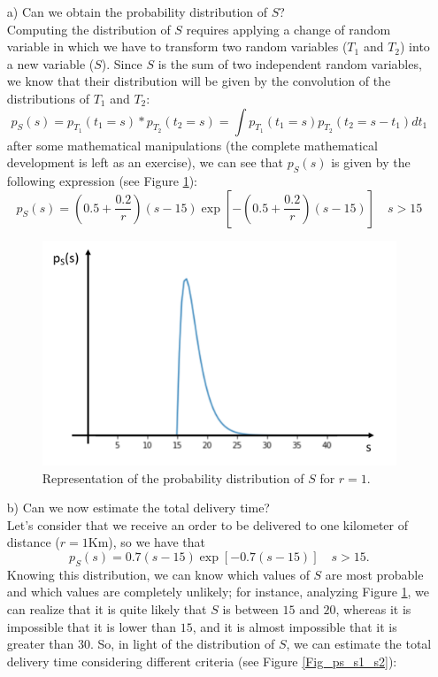 \begin{solution} 

\begin{itemize}
\item[a)] Can we obtain the probability distribution of $S$? \\
Computing the distribution of $S$ requires applying a change of random variable in which we have to transform two random variables ($T_1$ and $T_2$) into a new variable ($S$). Since $S$ is the sum of two independent random variables, we know that their distribution will be given by the convolution of the distributions of $T_1$ and $T_2$: 
$$ p_S(s) = p_{T_1} (t_1=s) \ast  p_{T_2} (t_2=s)  = \int  p_{T_1} (t_1=s)  p_{T_2} (t_2=s-t_1) d t_1   $$
after some mathematical manipulations (the complete mathematical development is left as an exercise), we can see that $p_S(s)$ is given by the following expression (see Figure \ref{Fig_ps}):
$$ p_S(s) = \left(0.5 + \frac{0.2}{r}\right) \left(s -15\right) \exp{\left[-\left(0.5 + \frac{0.2}{r}\right) \left(s-15\right)  \right]}   \quad  s >15$$

\begin{figure}[!t]
\begin{center}
\includegraphics[scale=.25]{Figures/Fig_MC1_1.png}
\caption{Representation of the probability distribution of $S$ for $r=1$.}
\label{Fig_ps}
\end{center}
\end{figure}
\vspace{0.2cm}
\item[b)] Can we now estimate the total delivery time?\\
Let's consider that we receive an order to be delivered to one kilometer of distance ($r=1$Km), so we have that 
$$ p_S(s) = 0.7 \left(s -15\right) \exp{\left[-0.7 \left(s-15\right)  \right]}   \quad  s >15.$$
Knowing this distribution, we can know which values of $S$ are most probable and which values are completely unlikely; for instance, analyzing Figure \ref{Fig_ps}, we can realize that it is quite likely that $S$ is between $15$ and $20$, whereas it is impossible that it is lower than $15$, and it is almost impossible that it is greater than $30$. So,  in light of the distribution of $S$, we can estimate the total delivery time considering different criteria (see Figure \ref{Fig_ps_s1_s2}):


\end{itemize}
\end{solution}
